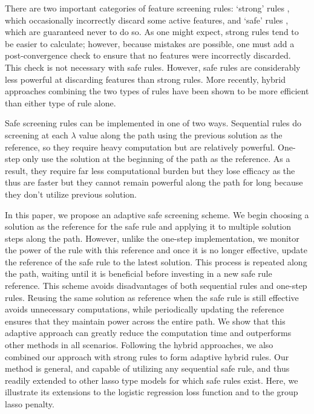 \documentclass[]{interact}
\theoremstyle{plain}%
\theoremstyle{definition}
\theoremstyle{remark}
\newcommand{\quotes}[1]{`#1'}
\begin{document}
There are two important categories of feature screening rules: \quotes{strong} rules \citep{Tibshirani2012, qian2019fast}, which occasionally incorrectly discard some active features, and \quotes{safe} rules \citep{ghaoui2010safe,wang2013lasso,xiang2012fast, xiang2011learning}, which are guaranteed never to do so.  As one might expect, strong rules tend to be easier to calculate; however, because mistakes are possible, one must add a post-convergence check to ensure that no features were incorrectly discarded. This check is not necessary with safe rules. However, safe rules are considerably less powerful at discarding features than strong rules. More recently, hybrid approaches \citep{Zeng2021} combining the two types of rules have been shown to be more efficient than either type of rule alone.

Safe screening rules can be implemented in one of two ways. Sequential rules do screening at each $\lambda$ value along the path using the previous solution as the reference, so they require heavy computation but are relatively powerful. One-step only use the solution at the beginning of the path as the reference. As a result, they require far less computational burden but they lose efficacy as the thus are faster but they cannot remain powerful along the path for long because they don't utilize previous solution.

In this paper, we propose an adaptive safe screening scheme. We begin choosing a solution as the reference for the safe rule and applying it to multiple solution steps along the path. However, unlike the one-step implementation, we monitor the power of the rule with this reference and once it is no longer effective, update the reference of the safe rule to the latest solution.  This process is repeated along the path, waiting until it is beneficial before investing in a new safe rule reference. This scheme avoids disadvantages of both sequential rules and one-step rules. Reusing the same solution as reference when the safe rule is still effective avoids unnecessary computations, while periodically updating the reference ensures that they maintain power across the entire path. We show that this adaptive approach can greatly reduce the computation time and outperforms other methods in all scenarios. Following the hybrid approaches, we also combined our approach with strong rules to form adaptive hybrid rules. Our method is general, and capable of utilizing any sequential safe rule, and thus readily extended to other lasso type models for which safe rules exist. Here, we illustrate its extensions to the logistic regression loss function and to the group lasso penalty.
\end{document}

